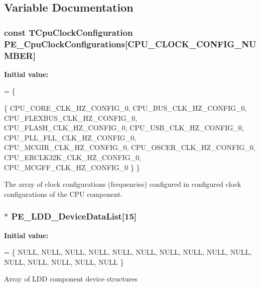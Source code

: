 \subsection{Variable Documentation}
\hypertarget{group___p_e___l_d_d__module_gab69281f0e90d16198a5595ed7f471441}{
\subsubsection[{P\-E\-\_\-\-Cpu\-Clock\-Configurations}]{\setlength{\rightskip}{0pt plus 5cm}const {\bf T\-Cpu\-Clock\-Configuration} P\-E\-\_\-\-Cpu\-Clock\-Configurations\mbox{[}C\-P\-U\-\_\-\-C\-L\-O\-C\-K\-\_\-\-C\-O\-N\-F\-I\-G\-\_\-\-N\-U\-M\-B\-E\-R\mbox{]}}}\label{group___p_e___l_d_d__module_gab69281f0e90d16198a5595ed7f471441}
{\bfseries Initial value\-:}
\begin{DoxyCode}
= \{
  
  \{
    CPU\_CORE\_CLK\_HZ\_CONFIG\_0,          
    CPU\_BUS\_CLK\_HZ\_CONFIG\_0,           
    CPU\_FLEXBUS\_CLK\_HZ\_CONFIG\_0,       
    CPU\_FLASH\_CLK\_HZ\_CONFIG\_0,         
    CPU\_USB\_CLK\_HZ\_CONFIG\_0,           
    CPU\_PLL\_FLL\_CLK\_HZ\_CONFIG\_0,       
    CPU\_MCGIR\_CLK\_HZ\_CONFIG\_0,         
    CPU\_OSCER\_CLK\_HZ\_CONFIG\_0,         
    CPU\_ERCLK32K\_CLK\_HZ\_CONFIG\_0,      
    CPU\_MCGFF\_CLK\_HZ\_CONFIG\_0          
  \}
\}
\end{DoxyCode}
The array of clock configurations (frequencies) configured in configured clock configurations of the C\-P\-U component. \hypertarget{group___p_e___l_d_d__module_ga4323b74fe3deac7b812be72b488df761}{
\subsubsection[{P\-E\-\_\-\-L\-D\-D\-\_\-\-Device\-Data\-List}]{$\ast$ P\-E\-\_\-\-L\-D\-D\-\_\-\-Device\-Data\-List\mbox{[}15\mbox{]}}}\label{group___p_e___l_d_d__module_ga4323b74fe3deac7b812be72b488df761}
{\bfseries Initial value\-:}
\begin{DoxyCode}
= \{
    NULL,
    NULL,
    NULL,
    NULL,
    NULL,
    NULL,
    NULL,
    NULL,
    NULL,
    NULL,
    NULL,
    NULL,
    NULL,
    NULL,
    NULL
  \}
\end{DoxyCode}
Array of L\-D\-D component device structures 